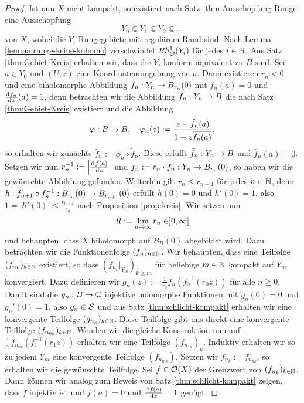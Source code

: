 \begin{proof}
  Ist nun $X$ nicht kompakt, so existiert nach Satz \ref{thm:Ausschöpfung-Runge}
  eine Ausschöpfung
  \[
  Y_0 \Subset Y_1 \Subset Y_2 \Subset \dots
  \]
  von $X$, wobei die $Y_i$ Rungegebiete mit regulärem Rand sind. 
  Nach Lemma \ref{lemma:runge-keine-kohomo} verschwindet
  $Rh_{\hol}^1(Y_i)$ für jedes $i \in \N$.
  Aus Satz \ref{thm:Gebiet-Kreis} erhalten wir, dass die $Y_i$
  konform äquivalent zu $B$ sind. 
  Sei $a \in Y_0$ und $(U,z)$ eine Koordinatenumgebung von $a$. Dann
  existieren $r_n <0$ und eine biholomorphe Abbildung $f_n: Y_n \ra
  B_{r_n}(0)$ mit $f_n(a) = 0$ und $\frac{\d[f_n]}{\d[z]}(a) = 1$, denn
  betrachten wir die Abbildung $\tilde f_n : Y_n \ra B$ die nach
  Satz \ref{thm:Gebiet-Kreis} existiert und die Abbildung
  \[
  \phi: B \ra B, \quad\phi_n(z) := \frac{z- \tilde f_n(a)}{1 - z \overline{\tilde
      f_n(a)}},
  \]
  so erhalten wir zunächts $\bar f_n := \phi_n \circ \tilde
  f_n$. Diese erfüllt $\bar f_n : Y_n \ra B$ und $\bar f_n(a) =
  0$. Setzen wir nun $r_n^{-1} := \left | \frac{\d[\bar f(a)]}{\d[z]}
  \right |$ und $f_n := r_n \cdot \bar f_n : Y_n \ra B_{r_n}(0)$, so
  haben wir die gewünschte Abbildung gefunden. 
  Weiterhin gilt $r_n \leq r_{n+1}$ für jedes $n \in \N$, denn $h:
  f_{n+1} \circ f_n^{-1} : B_{r_n}(0) \ra B_{r_{n+1}}(0)$ erfüllt $h(0)=0$
  und $h'(0) = 1$, also $1 = |h'(0)| \leq \frac{r_{n+1}}{r_n}$ nach
  Proposition \ref{prop:kreis}. 
  Wir setzen nun
  \[
  R := \lim_{n \ra \infty} r_n \in ]0, \infty]
  \]
  und behaupten, dass $X$ biholomorph auf $B_R(0)$ abgebildet wird. Dazu
  betrachten wir die Funktionenfolge $(f_n)_{n \in \N}$. Wir
  behaupten, dass eine Teilfolge $(f_{n_k})_{k \in \N}$ existiert,
  so dass $(f_{n_k}|_{Y_m})_{k \geq m}$ für beliebige $m \in \N$
  kompakt auf $Y_m$ konvergiert. 
  Dazu definieren wir $g_n(z) := \frac{1}{r_0} f_n(f_0^{-1}(r_0 z))$
  für alle $n \geq 0$. Damit sind die $g_n : B \ra \C$ injektive
  holomorphe Funktionen mit $g_n(0) = 0$ und $g_n'(0) = 1$, also
  $g_n \in \S$ und aus Satz \ref{thm:schlicht-kompakt}
  erhalten wir eine konvergente Teilfolge $(g_{n_k})_{k \in\N}$.
  Diese Teilfolge gibt uns direkt eine konvergente Teilfolge
  $(f_{n_{0k}})_{k\in\N}$.
  Wenden wir die gleiche Konstruktion nun auf
  $\frac{1}{r_1}f_{n_{0k}}(f_1^{-1}(r_1z))$ erhalten wir eine
  Teilfolge $(f_{n_{1k}})_k$. Induktiv erhalten wir so zu jedem $Y_m$
  eine konvergente Teilfolge $(f_{n_{mk}})$. 
  Setzen wir $f_{n_k} := f_{n_{kk}}$, so erhalten wir die gewünschte
  Teilfolge.
  Sei $f \in \hol(X)$ der Grenzwert von $(f_{n_k})_{k \in \N}$. Dann
  können wir analog zum Beweis von Satz \ref{thm:schlicht-kompakt}
  zeigen, dass $f$ injektiv ist und $f(a) = 0$ und
  $\frac{\d[f(a)]}{\d[z]} = 1$ genügt. 


\end{proof}

